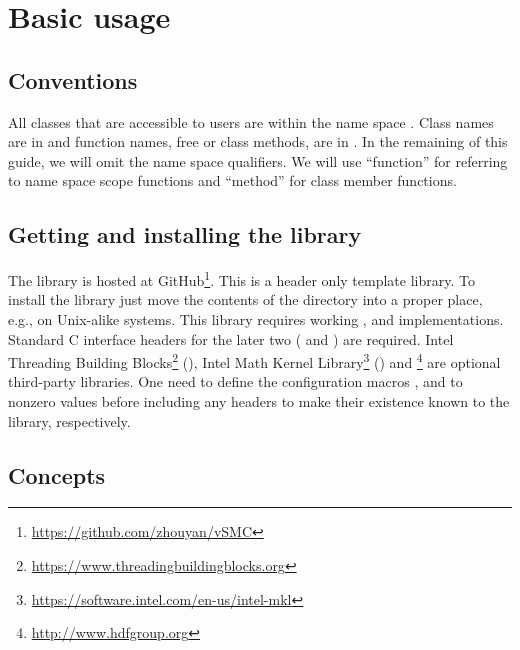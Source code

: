 \section{Basic usage}
\label{sec:Basic usage}

\subsection{Conventions}
\label{sub:Conventions}

All classes that are accessible to users are within the name space
. Class names are in  and function names,
free or class methods, are in . In the remaining of this
guide, we will omit the  name space qualifiers. We will use
``function'' for referring to name space scope functions and ``method'' for
class member functions.

\subsection{Getting and installing the library}
\label{sub:Getting and installing the library}

The library is hosted at
GitHub\footnote{\url{https://github.com/zhouyan/vSMC}}. This is a header only
\cpp template library. To install the library just move the contents of the
 directory into a proper place, e.g.,
 on Unix-alike systems. This library requires
working \cppoo, \blas and \lapack implementations. Standard C interface headers
for the later two ( and ) are required.
Intel Threading Building
Blocks\footnote{\url{https://www.threadingbuildingblocks.org}} (\tbb), Intel
Math Kernel Library\footnote{\url{https://software.intel.com/en-us/intel-mkl}}
(\mkl) and \hdf\footnote{\url{http://www.hdfgroup.org}} are optional
third-party libraries. One need to define the configuration macros
,  and
 to nonzero values before including any \vsmc headers
to make their existence known to the library, respectively.

\subsection{Concepts}
\label{sub:Concepts}

